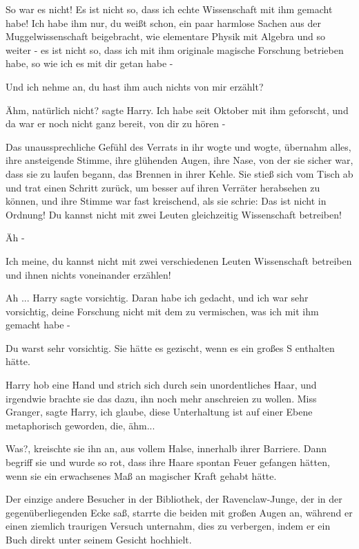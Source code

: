 \glqq So war es nicht! Es ist nicht so, dass ich echte Wissenschaft mit ihm
gemacht habe! Ich habe ihm nur, du weißt schon, ein paar harmlose Sachen aus der
Muggelwissenschaft beigebracht, wie elementare Physik mit Algebra und so weiter
- es ist nicht so, dass ich mit ihm originale magische Forschung betrieben habe,
so wie ich es mit dir getan habe -\grqq{}

\glqq Und ich nehme an, du hast ihm auch nichts von mir erzählt?\grqq{}

\glqq Ähm, natürlich nicht?\grqq{} sagte Harry. \glqq Ich habe seit Oktober mit
ihm geforscht, und da war er noch nicht ganz bereit, von dir zu hören -\grqq{}

Das unaussprechliche Gefühl des Verrats in ihr wogte und wogte, übernahm alles,
ihre ansteigende Stimme, ihre glühenden Augen, ihre Nase, von der sie sicher
war, dass sie zu laufen begann, das Brennen in ihrer Kehle. Sie stieß sich vom
Tisch ab und trat einen Schritt zurück, um besser auf ihren Verräter herabsehen
zu können, und ihre Stimme war fast kreischend, als sie schrie: \glqq Das ist
nicht in Ordnung! Du kannst nicht mit zwei Leuten gleichzeitig Wissenschaft
betreiben!\grqq{}

\glqq Äh -\grqq{}

\glqq Ich meine, du kannst nicht mit zwei verschiedenen Leuten Wissenschaft
betreiben und ihnen nichts voneinander erzählen!\grqq{}

\glqq Ah ...\grqq{} Harry sagte vorsichtig. \glqq Daran habe ich gedacht, und
ich war sehr vorsichtig, deine Forschung nicht mit dem zu vermischen, was ich
mit ihm gemacht habe -\grqq{}

\glqq Du warst sehr vorsichtig.\grqq{} Sie hätte es gezischt, wenn es ein großes
\glqq S\grqq{} enthalten hätte.

Harry hob eine Hand und strich sich durch sein unordentliches Haar, und
irgendwie brachte sie das dazu, ihn noch mehr anschreien zu wollen. \glqq Miss
Granger\grqq{}, sagte Harry, \glqq ich glaube, diese Unterhaltung ist auf einer
Ebene metaphorisch geworden, die, ähm...\grqq{}

\glqq Was?\grqq{}, kreischte sie ihn an, aus vollem Halse, innerhalb ihrer
Barriere. Dann begriff sie und wurde so rot, dass ihre Haare spontan Feuer
gefangen hätten, wenn sie ein erwachsenes Maß an magischer Kraft gehabt hätte.

Der einzige andere Besucher in der Bibliothek, der Ravenclaw-Junge, der in der
gegenüberliegenden Ecke saß, starrte die beiden mit großen Augen an, während er
einen ziemlich traurigen Versuch unternahm, dies zu verbergen, indem er ein Buch
direkt unter seinem Gesicht hochhielt.

